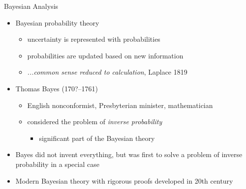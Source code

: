 \documentclass[10pt]{beamer}
\begin{document}
\begin{frame}{Bayesian Analysis}

  \begin{itemize}
  \item Bayesian probability theory
    \begin{itemize}
    \item uncertainty is represented with probabilities\pause
    \item probabilities are updated based on new information
    \item {\it ...common sense reduced to calculation},
       Laplace 1819
    \end{itemize}
    \pause
    \item Thomas Bayes (170?--1761)
    \begin{itemize}
    \item English nonconformist, Presbyterian minister,
      mathematician
    \item considered the problem of {\it inverse probability}\pause
      \begin{itemize}
        \item significant part of the Bayesian theory
      \end{itemize}
  \end{itemize}
  \pause
  \item Bayes did not invent everything, but was first to solve a
    problem of inverse probability in a special case
  \item Modern Bayesian theory with rigorous proofs developed in
    20th century
\end{itemize}
\end{frame}
\end{document}
